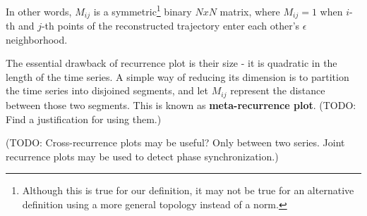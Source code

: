 \documentclass[11pt,czech,american,dvipsnames]{book}
\begin{document}
In other words, $M_{ij}$ is a symmetric\footnote{Although this is true for our definition, it may not be true for an alternative definition using a more general topology instead of a norm.} binary $N x N$ matrix, where $M_{ij} = 1$ when $i$-th and $j$-th points of the reconstructed trajectory enter each other's $\epsilon$ neighborhood.

The essential drawback of recurrence plot is their size - it is quadratic in the length of the time series. A simple way of reducing its dimension is to partition the time series into disjoined segments, and let $M_{ij}$ represent the distance between those two segments. This is known as \textbf{meta-recurrence plot}. \cite{kantz2004} (TODO: Find a justification for using them.)

(TODO: Cross-recurrence plots may be useful? Only between two series. Joint recurrence plots may be used to detect phase synchronization.)



\end{document}
